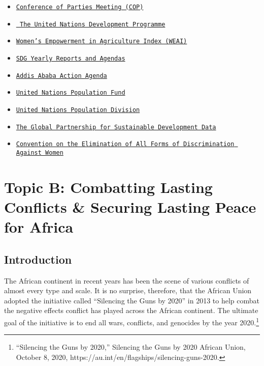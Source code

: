\documentclass[10pt, letterpaper]{article}
\begin{document}
\begin{itemize}
\item
\texttt{\href{https://unfccc.int/process/bodies/supreme-bodies/conference-of-the-parties-cop}{Conference of Parties Meeting (COP)}}

\item
\texttt{\href{https://www.undp.org/}{ The United Nations Development Programme}}
 
 \item
 \texttt{\href{https://www.ifpri.org/publication/womens-empowerment-agriculture-index}{Women's Empowerment in Agriculture Index (WEAI)}}
 
 \item
 \texttt{\href{https://www.un.org/sustainabledevelopment/progress-report/}{SDG Yearly Reports and Agendas}}
   
 \item
 \texttt{\href{https://sustainabledevelopment.un.org/index.php?page=view\&type=400\&nr=2051\&menu=35}{Addis Ababa Action Agenda}}
   
 \item
 \texttt{\href{https://www.unfpa.org/}{United Nations Population Fund}}
  
   \item
   \texttt{\href{https://population.un.org/wpp/}{United Nations Population Division}}
 \item
 \texttt{\href{https://www.data4sdgs.org/}{The Global Partnership for Sustainable Development Data}}
   
  \item
   \texttt{\href{https://www.ohchr.org/en/professionalinterest/pages/cedaw.aspx}{Convention on the Elimination of All Forms of Discrimination Against
  Women}}
 \end{itemize}

\newpage
\section{Topic B: Combatting Lasting Conflicts \& Securing
Lasting Peace for Africa}

\subsection{Introduction}

The African continent in recent years has been the scene of various
conflicts of almost every type and scale. It is no surprise, therefore,
that the African Union adopted the initiative called ``Silencing the
Guns by 2020'' in 2013 to help combat the negative effects conflict has
played across the African continent. The ultimate goal of the initiative
is to end all wars, conflicts, and genocides by the year
2020.\footnote{``Silencing the Guns by 2020,'' Silencing the Guns by
  2020 \textbar{} African Union, October 8, 2020,
  https://au.int/en/flagships/silencing-guns-2020.} \\
\end{document}
